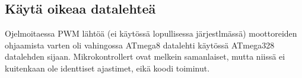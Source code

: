 \documentclass[]{article} %
\numberwithin{equation}{section}
\numberwithin{figure}{section}
\numberwithin{table}{section}
\begin{document}
  
\subsection{Käytä oikeaa datalehteä}
\label{sub:Kayta oikeaa datalehtea}


Ojelmoitaessa PWM lähtöä (ei käytössä lopullisessa järjestlmässä) moottoreiden ohjaamista varten oli vahingossa ATmega8 datalehti käytössä ATmega328 datalehden sijaan. Mikrokontrollert ovat melkein samanlaiset, mutta niissä ei kuitenkaan ole identtiset ajastimet, eikä koodi toiminut. 
\end{document}
